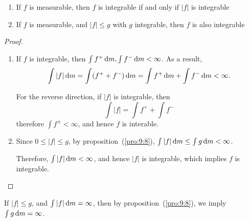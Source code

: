 \begin{proposition}
\begin{enumerate}
\item
If $f$ is measurable, then $f$ is integrable if and only if $|f|$ is integrable
\item
If $f$ is measurable, and $|f|\le g$ with $g$ integrable, then $f$ is also integrable
\end{enumerate}
\end{proposition}
\begin{proof}
\begin{enumerate}
\item
If $f$ is integrable, then $\int f^+\,\mathrm{d} m,\int f^-\,\mathrm{d} m<\infty$.
As a result,
\[
\int|f|\,\mathrm{d} m = \int(f^++f^-)\,\mathrm{d} m=\int f^+\,\mathrm{d} m+\int f^-\,\mathrm{d} m
<\infty.
\]

For the reverse direction, if $|f|$ is integrable, then 
\[
\int|f| = \int f^++\int f^-
\]
therefore $\int f^{\pm}<\infty$, and hence $f$ is interable.
\item
Since $0\le |f|\le g$, by proposition~(\ref{pro:9:8}), $\int|f|\,\mathrm{d} m\le \int g\,\mathrm{d} m<\infty$.

Therefore, $\int|f|\,\mathrm{d} m<\infty$, and hence $|f|$ is integrable, which implies $f$ is integrable.
\end{enumerate}
\end{proof}

\begin{remark}
If $|f|\le g$, and $\int|f|\,\mathrm{d} m=\infty$, then by proposition~(\ref{pro:9:8}), we imply $\int g\,\mathrm{d} m=\infty$.
\end{remark}












